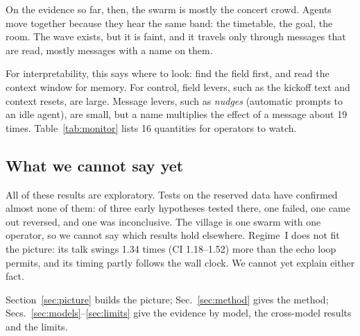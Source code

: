 On the evidence so far, then, the swarm is mostly the concert crowd. Agents move together because they hear the same band: the timetable, the goal, the room. The wave exists, but it is faint, and it travels only through messages that are read, mostly messages with a name on them.

For interpretability, this says where to look: find the field first, and read the context window for memory. For control, field levers, such as the kickoff text and context resets, are large. Message levers, such as \emph{nudges} (automatic prompts to an idle agent), are small, but a name multiplies the effect of a message about 19 times. Table~\ref{tab:monitor} lists 16 quantities for operators to watch.

\subsection*{What we cannot say yet}

All of these results are exploratory. Tests on the reserved data have confirmed almost none of them: of three early hypotheses tested there, one failed, one came out reversed, and one was inconclusive. The village is one swarm with one operator, so we cannot say which results hold elsewhere. Regime~I does not fit the picture: its talk swings 1.34 times (CI 1.18--1.52) more than the echo loop permits, and its timing partly follows the wall clock. We cannot yet explain either fact.


Section~\ref{sec:picture} builds the picture; Sec.~\ref{sec:method} gives the method; Secs.~\ref{sec:models}--\ref{sec:limits} give the evidence by model, the cross-model results and the limits.
